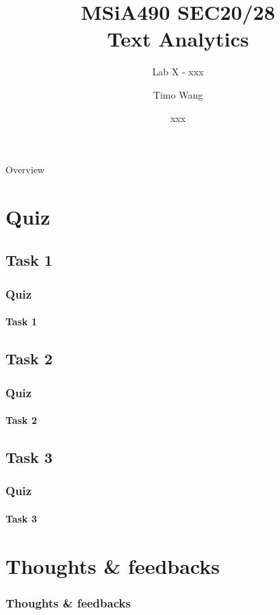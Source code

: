 \documentclass{beamer}
\begin{document}
\title{MSiA490 SEC20/28\\ Text Analytics}
\subtitle{Lab X - xxx}
\author{Timo Wang}
\date{xxx}

\begin{frame}
    \titlepage
\end{frame}

\begin{frame}{Overview}
    \tableofcontents[hideallsubsections]
\end{frame}

\section{Quiz}
\subsection{Task 1}
\begin{frame}
    \frametitle{Quiz}
    \framesubtitle{Task 1}
\end{frame}

\subsection{Task 2}
\begin{frame}
    \frametitle{Quiz}
    \framesubtitle{Task 2}
\end{frame}

\subsection{Task 3}
\begin{frame}
    \frametitle{Quiz}
    \framesubtitle{Task 3}
\end{frame}

\section{Thoughts \& feedbacks}
\begin{frame}
    \frametitle{Thoughts \& feedbacks}
    
\end{frame}
\end{document}
